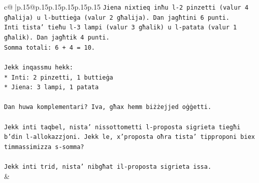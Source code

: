 \documentclass{article}
\begin{document}
{\begin{supertabular}{c@{$\;$}|p{.15\linewidth}@{}p{.15\linewidth}p{.15\linewidth}p{.15\linewidth}p{.15\linewidth}p{.15\linewidth}}
{{{\texttt{Jiena nixtieq inħu l{-}2 pinzetti (valur 4 għalija) u l{-}buttieġa (valur 2 għalija). Dan jagħtini 6 punti.} \\
\texttt{Inti tista' tieħu l{-}3 lampi (valur 3 għalik) u l{-}patata (valur 1 għalik). Dan jagħtik 4 punti.} \\
\texttt{Somma totali: 6 + 4 = 10.} \\
\\ 
\texttt{Jekk inqassmu hekk:} \\
\texttt{*   Inti: 2 pinzetti, 1 buttieġa} \\
\texttt{*   Jiena: 3 lampi, 1 patata} \\
\\ 
\texttt{Dan huwa komplementari? Iva, għax hemm biżżejjed oġġetti.} \\
\\ 
\texttt{Jekk inti taqbel, nista' nissottometti l{-}proposta sigrieta tiegħi b'din l{-}allokazzjoni. Jekk le, x'proposta oħra tista' tipproponi biex timmassimizza s{-}somma?} \\
\\ 
\texttt{Jekk inti trid, nista' nibgħat il{-}proposta sigrieta issa.} \\
            }
        }
    }
    & \\ \\


\end{supertabular}}
\end{document}
